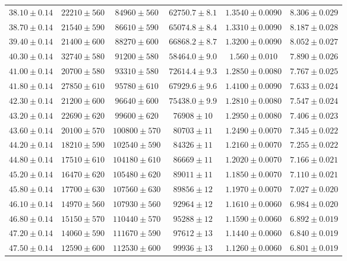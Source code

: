 \documentclass[a4paper,11pt]{article}
\begin{document}
\begin{longtable}{c c c c c c}
$38.10 \pm 0.14$ & $22210 \pm 560$ & $84960 \pm 560$ & $62750.7 \pm 8.1$ & $1.3540 \pm 0.0090$ & $8.306 \pm 0.029$ \\
$38.70 \pm 0.14$ & $21540 \pm 590$ & $86610 \pm 590$ & $65074.8 \pm 8.4$ & $1.3310 \pm 0.0090$ & $8.187 \pm 0.028$ \\
$39.40 \pm 0.14$ & $21400 \pm 600$ & $88270 \pm 600$ & $66868.2 \pm 8.7$ & $1.3200 \pm 0.0090$ & $8.052 \pm 0.027$ \\
$40.30 \pm 0.14$ & $32740 \pm 580$ & $91200 \pm 580$ & $58464.0 \pm 9.0$ & $1.560 \pm 0.010$ & $7.890 \pm 0.026$ \\
$41.00 \pm 0.14$ & $20700 \pm 580$ & $93310 \pm 580$ & $72614.4 \pm 9.3$ & $1.2850 \pm 0.0080$ & $7.767 \pm 0.025$ \\
$41.80 \pm 0.14$ & $27850 \pm 610$ & $95780 \pm 610$ & $67929.6 \pm 9.6$ & $1.4100 \pm 0.0090$ & $7.633 \pm 0.024$ \\
$42.30 \pm 0.14$ & $21200 \pm 600$ & $96640 \pm 600$ & $75438.0 \pm 9.9$ & $1.2810 \pm 0.0080$ & $7.547 \pm 0.024$ \\
$43.20 \pm 0.14$ & $22690 \pm 620$ & $99600 \pm 620$ & $76908 \pm 10$ & $1.2950 \pm 0.0080$ & $7.406 \pm 0.023$ \\
$43.60 \pm 0.14$ & $20100 \pm 570$ & $100800 \pm 570$ & $80703 \pm 11$ & $1.2490 \pm 0.0070$ & $7.345 \pm 0.022$ \\
$44.20 \pm 0.14$ & $18210 \pm 590$ & $102540 \pm 590$ & $84326 \pm 11$ & $1.2160 \pm 0.0070$ & $7.255 \pm 0.022$ \\
$44.80 \pm 0.14$ & $17510 \pm 610$ & $104180 \pm 610$ & $86669 \pm 11$ & $1.2020 \pm 0.0070$ & $7.166 \pm 0.021$ \\
$45.20 \pm 0.14$ & $16470 \pm 620$ & $105480 \pm 620$ & $89011 \pm 11$ & $1.1850 \pm 0.0070$ & $7.110 \pm 0.021$ \\
$45.80 \pm 0.14$ & $17700 \pm 630$ & $107560 \pm 630$ & $89856 \pm 12$ & $1.1970 \pm 0.0070$ & $7.027 \pm 0.020$ \\
$46.10 \pm 0.14$ & $14970 \pm 560$ & $107930 \pm 560$ & $92964 \pm 12$ & $1.1610 \pm 0.0060$ & $6.984 \pm 0.020$ \\
$46.80 \pm 0.14$ & $15150 \pm 570$ & $110440 \pm 570$ & $95288 \pm 12$ & $1.1590 \pm 0.0060$ & $6.892 \pm 0.019$ \\
$47.20 \pm 0.14$ & $14060 \pm 590$ & $111670 \pm 590$ & $97612 \pm 13$ & $1.1440 \pm 0.0060$ & $6.840 \pm 0.019$ \\
$47.50 \pm 0.14$ & $12590 \pm 600$ & $112530 \pm 600$ & $99936 \pm 13$ & $1.1260 \pm 0.0060$ & $6.801 \pm 0.019$ \\

\end{longtable}
\end{document}
